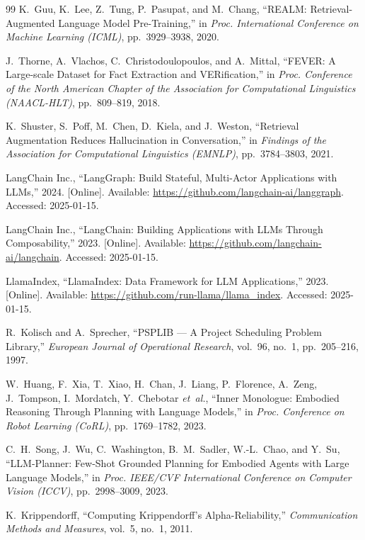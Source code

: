 \documentclass[journal]{IEEEtran}
\begin{document}
\begin{thebibliography}{99}
K.~Guu, K.~Lee, Z.~Tung, P.~Pasupat, and M.~Chang, ``{REALM}: Retrieval-Augmented Language Model Pre-Training,'' in \textit{Proc. International Conference on Machine Learning (ICML)}, pp.~3929--3938, 2020.

J.~Thorne, A.~Vlachos, C.~Christodoulopoulos, and A.~Mittal, ``{FEVER}: A Large-scale Dataset for Fact Extraction and VERification,'' in \textit{Proc. Conference of the North American Chapter of the Association for Computational Linguistics (NAACL-HLT)}, pp.~809--819, 2018.

K.~Shuster, S.~Poff, M.~Chen, D.~Kiela, and J.~Weston, ``Retrieval Augmentation Reduces Hallucination in Conversation,'' in \textit{Findings of the Association for Computational Linguistics (EMNLP)}, pp.~3784--3803, 2021.

{LangChain Inc.}, ``{LangGraph}: Build Stateful, Multi-Actor Applications with {LLMs},'' 2024. [Online]. Available: \url{https://github.com/langchain-ai/langgraph}. Accessed: 2025-01-15.

{LangChain Inc.}, ``{LangChain}: Building Applications with {LLMs} Through Composability,'' 2023. [Online]. Available: \url{https://github.com/langchain-ai/langchain}. Accessed: 2025-01-15.

{LlamaIndex}, ``{LlamaIndex}: Data Framework for {LLM} Applications,'' 2023. [Online]. Available: \url{https://github.com/run-llama/llama_index}. Accessed: 2025-01-15.

R.~Kolisch and A.~Sprecher, ``{PSPLIB} --- A Project Scheduling Problem Library,'' \textit{European Journal of Operational Research}, vol.~96, no.~1, pp.~205--216, 1997.

W.~Huang, F.~Xia, T.~Xiao, H.~Chan, J.~Liang, P.~Florence, A.~Zeng, J.~Tompson, I.~Mordatch, Y.~Chebotar \textit{et~al.}, ``Inner Monologue: Embodied Reasoning Through Planning with Language Models,'' in \textit{Proc. Conference on Robot Learning (CoRL)}, pp.~1769--1782, 2023.

C.~H.~Song, J.~Wu, C.~Washington, B.~M.~Sadler, W.-L.~Chao, and Y.~Su, ``{LLM-Planner}: Few-Shot Grounded Planning for Embodied Agents with Large Language Models,'' in \textit{Proc. IEEE/CVF International Conference on Computer Vision (ICCV)}, pp.~2998--3009, 2023.

K.~Krippendorff, ``Computing Krippendorff's Alpha-Reliability,'' \textit{Communication Methods and Measures}, vol.~5, no.~1, 2011.

\end{thebibliography}
\end{document}
